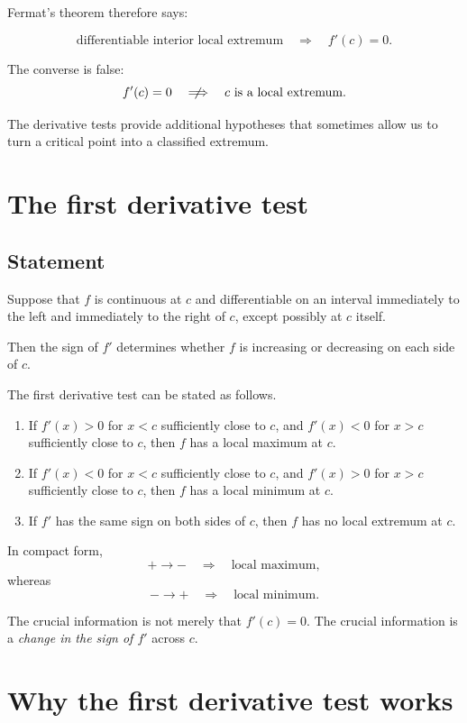 \documentclass{essay}
\begin{document}
Fermat's theorem therefore says:

\[
\text{differentiable interior local extremum}
\quad\Longrightarrow\quad
f'(c)=0.
\]

The converse is false:
\[
f'(c)=0
\quad\centernot\Longrightarrow\quad
\text{\(c\) is a local extremum}.
\]

The derivative tests provide additional hypotheses that sometimes allow us to turn a critical point into a classified extremum.

\section{The first derivative test}

\subsection{Statement}

Suppose that \(f\) is continuous at \(c\) and differentiable on an interval immediately to the left and immediately to the right of \(c\), except possibly at \(c\) itself.

Then the sign of \(f'\) determines whether \(f\) is increasing or decreasing on each side of \(c\).

The first derivative test can be stated as follows.

\begin{enumerate}
    \item If \(f'(x)>0\) for \(x<c\) sufficiently close to \(c\), and \(f'(x)<0\) for \(x>c\) sufficiently close to \(c\), then \(f\) has a local maximum at \(c\).

    \item If \(f'(x)<0\) for \(x<c\) sufficiently close to \(c\), and \(f'(x)>0\) for \(x>c\) sufficiently close to \(c\), then \(f\) has a local minimum at \(c\).

    \item If \(f'\) has the same sign on both sides of \(c\), then \(f\) has no local extremum at \(c\).
\end{enumerate}

In compact form,
\[
+\longrightarrow -
\quad\Rightarrow\quad
\text{local maximum},
\]
whereas
\[
-\longrightarrow +
\quad\Rightarrow\quad
\text{local minimum}.
\]

The crucial information is not merely that \(f'(c)=0\). The crucial information is a \emph{change in the sign of \(f'\)} across \(c\).

\section{Why the first derivative test works}
\end{document}
